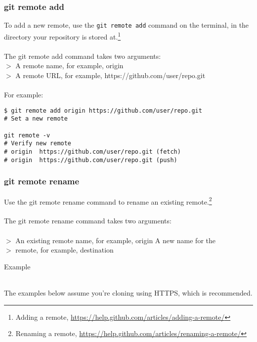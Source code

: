 \documentclass[12pt,letterpaper,dvips]{article}
\newcommand{\cmd}[1]{\texttt{#1}}
\begin{document}
\newpage
\subsubsection{git remote add}
To add a new remote, use the \cmd{git remote add} command on the
terminal, in the directory your repository is stored at.\footnote{Adding a remote,
\href{https://help.github.com/articles/adding-a-remote/}{https://help.github.com/articles/adding-a-remote/}}
\\
\\
The git remote add command takes two arguments:
\\
$>$ A remote name, for example, origin\\
$>$ A remote URL, for example, https://github.com/user/repo.git
\\
\\
For example:
\begin{Verbatim}
$ git remote add origin https://github.com/user/repo.git
# Set a new remote

git remote -v
# Verify new remote
# origin  https://github.com/user/repo.git (fetch)
# origin  https://github.com/user/repo.git (push)
\end{Verbatim}


\subsubsection{git remote rename}
Use the git remote rename command to rename an existing remote.\footnote{Renaming a remote,
\href{https://help.github.com/articles/renaming-a-remote/}{https://help.github.com/articles/renaming-a-remote/}}
\\
\\
The git remote rename command takes two arguments:
\\
\\
$>$ An existing remote name, for example, origin A new name for the\\
$>$ remote, for example, destination

\newpage
\noindent \begin{bf}Example\end{bf}\\
The examples below assume you're cloning using HTTPS, which is recommended.
\end{document}

